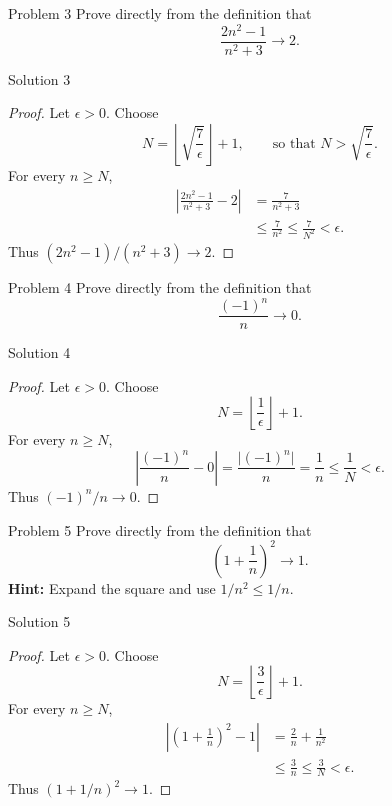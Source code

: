 \documentclass{beamer}
\begin{document}
\begin{frame}{Problem 3}
Prove directly from the definition that
\[
  \frac{2n^2-1}{n^2+3}\longrightarrow 2.
\]
\end{frame}

\begin{frame}{Solution 3}
\begin{proof}
Let $\epsilon>0$. Choose
\[
  N=\left\lfloor\sqrt{\frac{7}{\epsilon}}\right\rfloor+1,
  \qquad\text{so that }N>\sqrt{\frac{7}{\epsilon}}.
\]
For every $n\geq N$,
\[
\begin{aligned}
  \left\lvert\frac{2n^2-1}{n^2+3}-2\right\rvert
  &=\frac{7}{n^2+3}\\
  &\leq\frac{7}{n^2}\leq\frac{7}{N^2}<\epsilon.
\end{aligned}
\]
Thus $(2n^2-1)/(n^2+3)\to2$.
\end{proof}
\end{frame}

\begin{frame}{Problem 4}
Prove directly from the definition that
\[
  \frac{(-1)^n}{n}\longrightarrow 0.
\]
\end{frame}

\begin{frame}{Solution 4}
\begin{proof}
Let $\epsilon>0$. Choose
\[
  N=\left\lfloor\frac{1}{\epsilon}\right\rfloor+1.
\]
For every $n\geq N$,
\[
  \left\lvert\frac{(-1)^n}{n}-0\right\rvert
  =\frac{\lvert(-1)^n\rvert}{n}
  =\frac{1}{n}\leq\frac{1}{N}<\epsilon.
\]
Thus $(-1)^n/n\to0$.
\end{proof}
\end{frame}

\begin{frame}{Problem 5}
Prove directly from the definition that
\[
  \left(1+\frac{1}{n}\right)^2\longrightarrow 1.
\]
\textbf{Hint:} Expand the square and use $1/n^2\leq1/n$.
\end{frame}

\begin{frame}{Solution 5}
\begin{proof}
Let $\epsilon>0$. Choose
\[
  N=\left\lfloor\frac{3}{\epsilon}\right\rfloor+1.
\]
For every $n\geq N$,
\[
\begin{aligned}
  \left\lvert\left(1+\frac{1}{n}\right)^2-1\right\rvert
  &=\frac{2}{n}+\frac{1}{n^2}\\
  &\leq\frac{3}{n}\leq\frac{3}{N}<\epsilon.
\end{aligned}
\]
Thus $(1+1/n)^2\to1$.
\end{proof}
\end{frame}
\end{document}

